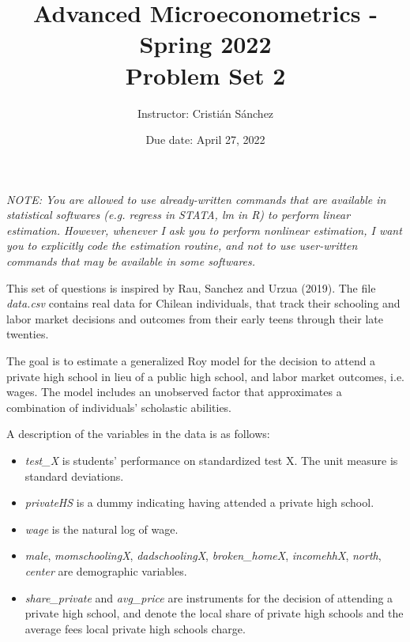 \documentclass[english,12pt]{article}
\begin{document}
\title{\sc Advanced Microeconometrics - Spring 2022\\Problem Set 2}
\author{Instructor: Cristi\'an S\'anchez}
\date{Due date: April 27, 2022}

\maketitle


\bigskip
\bigskip


\noindent \textit{NOTE: You are allowed to use already-written commands that are available in statistical softwares (e.g. regress in STATA, lm in R) to perform linear estimation. However, whenever I ask you to perform nonlinear estimation, I want you to explicitly code the estimation routine, and not to use user-written commands that may be available in some softwares.}\\

\bigskip

\noindent This set of questions is inspired by Rau, Sanchez and Urzua (2019). The file \textit{data.csv} contains real data for Chilean individuals, that track their schooling and labor market decisions and outcomes from their early teens through their late twenties. 

The goal is to estimate a generalized Roy model for the decision to attend a private high school in lieu of a public high school, and labor market outcomes, i.e. wages. The model includes an unobserved factor that approximates a combination of individuals' scholastic abilities.

A description of the variables in the data is as follows:
\begin{itemize}
	\item \textit{test\_X} is students' performance on standardized test X. The unit measure is standard deviations.
	\item \textit{privateHS} is a dummy indicating having attended a private high school.
	\item \textit{wage} is the natural log of wage.
	\item \textit{male}, \textit{momschoolingX}, \textit{dadschoolingX}, \textit{broken\_homeX}, \textit{incomehhX}, \textit{north}, \textit{center} are demographic variables.
	\item \textit{share\_private} and \textit{avg\_price} are instruments for the decision of attending a private high school, and denote the local share of private high schools and the average fees local private high schools charge.
\end{itemize}
\end{document}
